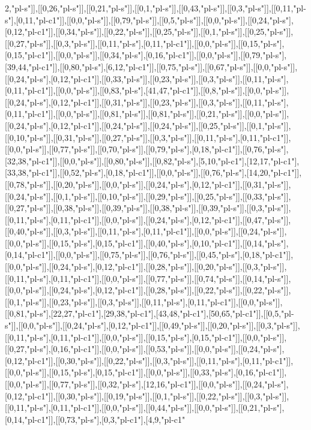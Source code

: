2,"pl-s"]],[[0,26,"pl-s"]],[[0,21,"pl-s"]],[[0,1,"pl-s"]],[[0,43,"pl-s"]],[[0,3,"pl-s"]],[[0,11,"pl-s"],[0,11,"pl-c1"]],[[0,0,"pl-s"]],[[0,79,"pl-s"]],[[0,5,"pl-s"]],[[0,0,"pl-s"]],[[0,24,"pl-s"],[0,12,"pl-c1"]],[[0,34,"pl-s"]],[[0,22,"pl-s"]],[[0,25,"pl-s"]],[[0,1,"pl-s"]],[[0,25,"pl-s"]],[[0,27,"pl-s"]],[[0,3,"pl-s"]],[[0,11,"pl-s"],[0,11,"pl-c1"]],[[0,0,"pl-s"]],[[0,15,"pl-s"],[0,15,"pl-c1"]],[[0,0,"pl-s"]],[[0,34,"pl-s"],[0,16,"pl-c1"]],[[0,0,"pl-s"]],[[0,79,"pl-s"],[39,44,"pl-c1"]],[[0,80,"pl-s"],[6,12,"pl-c1"]],[[0,75,"pl-s"]],[[0,67,"pl-s"]],[[0,0,"pl-s"]],[[0,24,"pl-s"],[0,12,"pl-c1"]],[[0,33,"pl-s"]],[[0,23,"pl-s"]],[[0,3,"pl-s"]],[[0,11,"pl-s"],[0,11,"pl-c1"]],[[0,0,"pl-s"]],[[0,83,"pl-s"],[41,47,"pl-c1"]],[[0,8,"pl-s"]],[[0,0,"pl-s"]],[[0,24,"pl-s"],[0,12,"pl-c1"]],[[0,31,"pl-s"]],[[0,23,"pl-s"]],[[0,3,"pl-s"]],[[0,11,"pl-s"],[0,11,"pl-c1"]],[[0,0,"pl-s"]],[[0,81,"pl-s"]],[[0,81,"pl-s"]],[[0,21,"pl-s"]],[[0,0,"pl-s"]],[[0,24,"pl-s"],[0,12,"pl-c1"]],[[0,24,"pl-s"]],[[0,24,"pl-s"]],[[0,25,"pl-s"]],[[0,1,"pl-s"]],[[0,10,"pl-s"]],[[0,31,"pl-s"]],[[0,27,"pl-s"]],[[0,3,"pl-s"]],[[0,11,"pl-s"],[0,11,"pl-c1"]],[[0,0,"pl-s"]],[[0,77,"pl-s"]],[[0,70,"pl-s"]],[[0,79,"pl-s"],[0,18,"pl-c1"]],[[0,76,"pl-s"],[32,38,"pl-c1"]],[[0,0,"pl-s"]],[[0,80,"pl-s"]],[[0,82,"pl-s"],[5,10,"pl-c1"],[12,17,"pl-c1"],[33,38,"pl-c1"]],[[0,52,"pl-s"],[0,18,"pl-c1"]],[[0,0,"pl-s"]],[[0,76,"pl-s"],[14,20,"pl-c1"]],[[0,78,"pl-s"]],[[0,20,"pl-s"]],[[0,0,"pl-s"]],[[0,24,"pl-s"],[0,12,"pl-c1"]],[[0,31,"pl-s"]],[[0,24,"pl-s"]],[[0,1,"pl-s"]],[[0,10,"pl-s"]],[[0,29,"pl-s"]],[[0,25,"pl-s"]],[[0,33,"pl-s"]],[[0,27,"pl-s"]],[[0,38,"pl-s"]],[[0,39,"pl-s"]],[[0,38,"pl-s"]],[[0,39,"pl-s"]],[[0,3,"pl-s"]],[[0,11,"pl-s"],[0,11,"pl-c1"]],[[0,0,"pl-s"]],[[0,24,"pl-s"],[0,12,"pl-c1"]],[[0,47,"pl-s"]],[[0,40,"pl-s"]],[[0,3,"pl-s"]],[[0,11,"pl-s"],[0,11,"pl-c1"]],[[0,0,"pl-s"]],[[0,24,"pl-s"]],[[0,0,"pl-s"]],[[0,15,"pl-s"],[0,15,"pl-c1"]],[[0,40,"pl-s"],[0,10,"pl-c1"]],[[0,14,"pl-s"],[0,14,"pl-c1"]],[[0,0,"pl-s"]],[[0,75,"pl-s"]],[[0,76,"pl-s"]],[[0,45,"pl-s"],[0,18,"pl-c1"]],[[0,0,"pl-s"]],[[0,24,"pl-s"],[0,12,"pl-c1"]],[[0,28,"pl-s"]],[[0,20,"pl-s"]],[[0,3,"pl-s"]],[[0,11,"pl-s"],[0,11,"pl-c1"]],[[0,0,"pl-s"]],[[0,77,"pl-s"]],[[0,74,"pl-s"]],[[0,14,"pl-s"]],[[0,0,"pl-s"]],[[0,24,"pl-s"],[0,12,"pl-c1"]],[[0,28,"pl-s"]],[[0,22,"pl-s"]],[[0,22,"pl-s"]],[[0,1,"pl-s"]],[[0,23,"pl-s"]],[[0,3,"pl-s"]],[[0,11,"pl-s"],[0,11,"pl-c1"]],[[0,0,"pl-s"]],[[0,81,"pl-s"],[22,27,"pl-c1"],[29,38,"pl-c1"],[43,48,"pl-c1"],[50,65,"pl-c1"]],[[0,5,"pl-s"]],[[0,0,"pl-s"]],[[0,24,"pl-s"],[0,12,"pl-c1"]],[[0,49,"pl-s"]],[[0,20,"pl-s"]],[[0,3,"pl-s"]],[[0,11,"pl-s"],[0,11,"pl-c1"]],[[0,0,"pl-s"]],[[0,15,"pl-s"],[0,15,"pl-c1"]],[[0,0,"pl-s"]],[[0,27,"pl-s"],[0,16,"pl-c1"]],[[0,0,"pl-s"]],[[0,53,"pl-s"]],[[0,0,"pl-s"]],[[0,24,"pl-s"],[0,12,"pl-c1"]],[[0,30,"pl-s"]],[[0,22,"pl-s"]],[[0,3,"pl-s"]],[[0,11,"pl-s"],[0,11,"pl-c1"]],[[0,0,"pl-s"]],[[0,15,"pl-s"],[0,15,"pl-c1"]],[[0,0,"pl-s"]],[[0,33,"pl-s"],[0,16,"pl-c1"]],[[0,0,"pl-s"]],[[0,77,"pl-s"]],[[0,32,"pl-s"],[12,16,"pl-c1"]],[[0,0,"pl-s"]],[[0,24,"pl-s"],[0,12,"pl-c1"]],[[0,30,"pl-s"]],[[0,19,"pl-s"]],[[0,1,"pl-s"]],[[0,22,"pl-s"]],[[0,3,"pl-s"]],[[0,11,"pl-s"],[0,11,"pl-c1"]],[[0,0,"pl-s"]],[[0,44,"pl-s"]],[[0,0,"pl-s"]],[[0,21,"pl-s"],[0,14,"pl-c1"]],[[0,73,"pl-s"],[0,3,"pl-c1"],[4,9,"pl-c1"